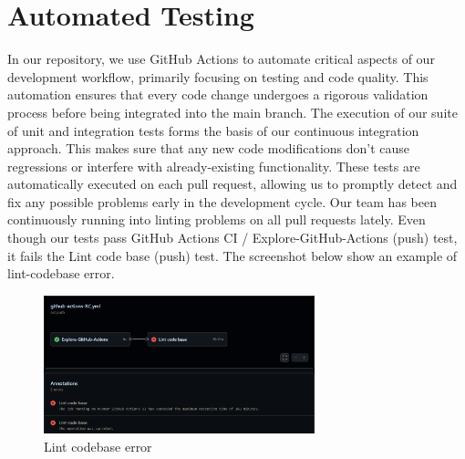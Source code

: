 \documentclass[12pt, titlepage]{article}
\begin{document}
\section{Automated Testing}

In our repository, we use GitHub Actions to automate critical aspects of our development workflow, primarily focusing on testing and code quality. This automation ensures that every code change undergoes a rigorous validation process before being integrated into the main branch. The execution of our suite of unit and integration tests forms the basis of our continuous integration approach. This makes sure that any new code modifications don't cause regressions or interfere with already-existing functionality. These tests are automatically executed on each pull request, allowing us to promptly detect and fix any possible problems early in the development cycle. Our team has been continuously running into linting problems on all pull requests lately. Even though our tests pass GitHub Actions CI / Explore-GitHub-Actions (push) test, it fails the Lint code base (push) test. The screenshot below show an example of lint-codebase error.

\begin{figure}[h]
  \centering
  \includegraphics[width=0.7\textwidth]{lintCodebaseError.png}
  \caption{Lint codebase error}
  \label{FigUH}
\end{figure}

\newpage
\end{document}
